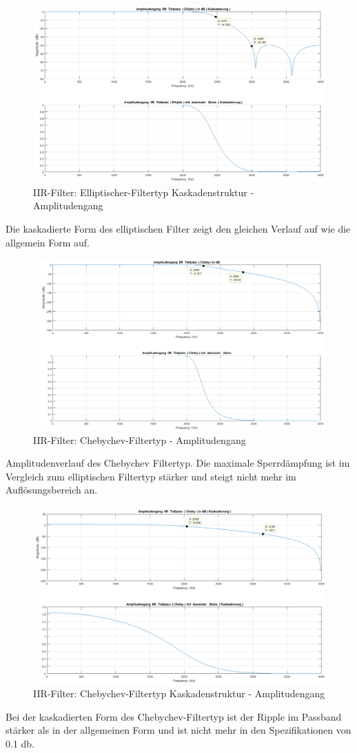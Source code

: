 \begin{figure}[h]
	\centering
	\includegraphics[width=0.7\linewidth]{Bilder/Attachment_A_ELLIP_KASKADE}
	\caption{IIR-Filter: Elliptischer-Filtertyp Kaskadenstruktur - Amplitudengang}
	\label{fig:Attachment_A_ELLIP_KASKADE}
\end{figure}
\noindent Die kaskadierte Form des elliptischen Filter zeigt den gleichen Verlauf auf wie die allgemein Form auf.



\begin{figure}[h]
\centering
\includegraphics[width=0.7\linewidth]{Bilder/Attachment_A_CHEBY}
\caption{IIR-Filter: Chebychev-Filtertyp - Amplitudengang}
\label{fig:Attachment_A_CHEBY}
\end{figure}
\noindent Amplitudenverlauf des Chebychev Filtertyp. Die maximale Sperrdämpfung ist im Vergleich zum elliptischen Filtertyp stärker und steigt nicht mehr im Auflösungsbereich an.

\newpage

\begin{figure}[h]
\centering
\includegraphics[width=0.7\linewidth]{Bilder/Attachment_A_CHEBY_KASKADE}
\caption{IIR-Filter: Chebychev-Filtertyp Kaskadenstruktur - Amplitudengang}
\label{fig:Attachment_A_CHEBY_KASKADE}
\end{figure}
\noindent Bei der kaskadierten Form des Chebychev-Filtertyp ist der Ripple im Passband stärker als in der allgemeinen Form und ist nicht mehr in den Spezifikationen von 0.1 db.\\

